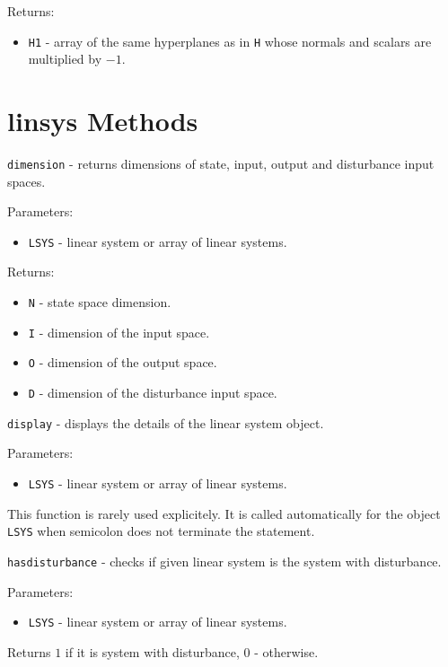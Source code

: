 \documentclass{report}
\begin{document}
Returns:
\begin{itemize}
\item {\tt H1} - array of the same hyperplanes as in {\tt H} whose normals and
scalars are multiplied by $-1$.
\end{itemize}



\newpage

\section{linsys Methods}
{\Large {\tt dimension}} - returns dimensions of state, input, output and
disturbance input spaces.

Parameters:
\begin{itemize}
\item {\tt LSYS} - linear system or array of linear systems.
\end{itemize}

Returns:
\begin{itemize}
\item {\tt N} - state space dimension.
\item {\tt I} - dimension of the input space.
\item {\tt O} - dimension of the output space.
\item {\tt D} - dimension of the disturbance input space.
\end{itemize}

\newpage

{\Large {\tt display}} - displays the details of the linear system object.

Parameters:
\begin{itemize}
\item {\tt LSYS} - linear system or array of linear systems.
\end{itemize}
This function is rarely used explicitely. It is called automatically
for the object {\tt LSYS} when semicolon does not terminate the statement.

\newpage

{\Large {\tt hasdisturbance}} - checks if given linear system is the system
with disturbance.

Parameters:
\begin{itemize}
\item {\tt LSYS} - linear system or array of linear systems.
\end{itemize}

Returns $1$ if it is system with disturbance, $0$ - otherwise.
\end{document}
